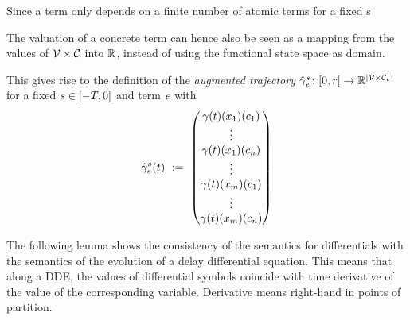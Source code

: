     \begin{definition}\label{def:aug-trajectory}
        Since a term only depends on a finite number of atomic terms for a fixed s
        
        The valuation of a concrete term can hence also be seen as a mapping from the values of $\delayvars$
        into $\R$, instead of using the functional state space as domain.

        This gives rise to the definition of the \emph{augmented trajectory} $\augtrajectory[s]{\astrm}\from\compactum{0}{r}\to\R^{\abs{\delayvars[\astrm]}}$ for a fixed $s\in\closeddelayinterval$ and term $\astrm$ with
        \begin{equation*}
            \augtrajectory[s]{\astrm}(t) \defeq \colvec{\trajectory(t)(x_1)(c_1)\\ \vdots\\ \trajectory(t)(x_1)(c_n)\\ \vdots\\ \trajectory(t)(x_m)(c_1)\\ \vdots\\ \trajectory(t)(x_m)(c_n)}
        \end{equation*}
    \end{definition}

    The following lemma shows the consistency of the semantics for differentials with the semantics of the evolution of a delay differential equation.
    This means that along a DDE, the values of differential symbols coincide with time derivative of the value of the corresponding variable.
    Derivative means right-hand in points of partition.

